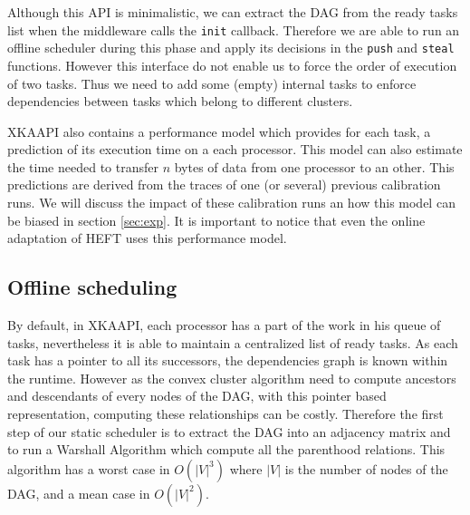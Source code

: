 \documentclass[10pt, conference, compsocconf,pdftex,dvipsnames]{IEEEtran}
\begin{document}
Although this API is minimalistic, we can extract the DAG from the ready tasks
list when the middleware calls the \texttt{init} callback. Therefore we are
able to run an offline scheduler during this phase and apply its decisions in
the \texttt{push} and \texttt{steal} functions. However this interface do not
enable us to force the order of execution of two tasks. Thus we need to add
some (empty) internal tasks to enforce dependencies between
tasks which belong to different clusters.

XKAAPI also contains a performance model which provides for each task, a
prediction of its execution time on a each processor. This model can also
estimate the time needed to transfer $n$ bytes of data from one processor to
an other. This predictions are derived from the traces of one (or several)
previous calibration runs. We will discuss the impact of these calibration
runs an how this model can be biased in section \ref{sec:exp}. It is important
to notice that even the online adaptation of HEFT uses this performance model.

\subsection{Offline scheduling}
\label{sec:impl-off}
By default, in XKAAPI, each processor has a part of the work in his queue of
tasks, nevertheless it is able to maintain a centralized list of ready tasks.
As each task has a pointer to all its successors, the dependencies graph is
known within the runtime. However as the convex cluster algorithm need to
compute ancestors and descendants of every nodes of the DAG, with this pointer
based representation, computing these relationships can be costly. Therefore
the first step of our static scheduler is to extract the DAG into an adjacency
matrix and to run a Warshall Algorithm which compute all the parenthood
relations. This algorithm has a worst case in $O(|V|^3)$ where $|V|$ is the
number of nodes of the DAG, and a mean case in $O(|V|^2)$.
\end{document}
